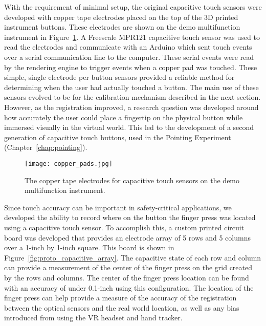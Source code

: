 With the requirement of minimal setup, the original capacitive touch sensors were developed with copper tape electrodes placed on the top of the 3D printed instrument buttons.
These electrodes are shown on the demo multifunction instrument in Figure~\ref{fig:copper_pads}.
A Freescale MPR121 capacitive touch sensor was used to read the electrodes and communicate with an Arduino which sent touch events over a serial communication line to the computer.
These serial events were read by the rendering engine to trigger events when a copper pad was touched.
These simple, single electrode per button sensors provided a reliable method for determining when the user had actually touched a button.
The main use of these sensors evolved to be for the calibration mechanism described in the next section.
However, as the registration improved, a research question was developed around how accurately the user could place a fingertip on the physical button while immersed visually in the virtual world.
This led to the development of a second generation of capacitive touch buttons, used in the Pointing Experiment (Chapter~\ref{chap:pointing}).

\begin{figure}
    \centering
    \texttt{[image: copper\_pads.jpg]}
    \caption{The copper tape electrodes for capacitive touch sensors on the demo multifunction instrument.}
    \label{fig:copper_pads}
\end{figure}

Since touch accuracy can be important in safety-critical applications, we developed the ability to record where on the button the finger press was located using a capacitive touch sensor.
To accomplish this, a custom printed circuit board was developed that provides an electrode array of 5 rows and 5 columns over a 1-inch by 1-inch square.
This board is shown in Figure~\ref{fig:proto_capacitive_array}.
The capacitive state of each row and column can provide a measurement of the center of the finger press on the grid created by the rows and columns.
The center of the finger press location can be found with an accuracy of under 0.1-inch using this configuration.
The location of the finger press can help provide a measure of the accuracy of the registration between the optical sensors and the real world location, as well as any bias introduced from using the VR headset and hand tracker.

